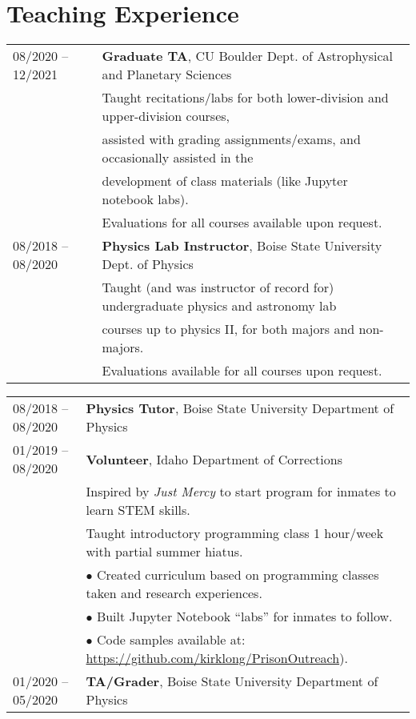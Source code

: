 \documentclass[11pt]{article}
\begin{document}
\section{Teaching Experience}
\begin{tabular}{ll}
08/2020 --	12/2021 & 	\textbf{Graduate TA}, CU Boulder Dept. of Astrophysical and Planetary Sciences \vspace{1mm} \\
      & Taught recitations/labs for both lower-division and upper-division courses, \\
      & assisted with grading assignments/exams, and occasionally assisted in the \\
      & development of class materials (like Jupyter notebook labs).\\
      & Evaluations for all courses available upon request. \vspace{2mm} \\
08/2018 --	08/2020	& 	\textbf{Physics Lab Instructor}, Boise State University Dept. of Physics \vspace{1mm} \\
      & Taught (and was instructor of record for) undergraduate physics and astronomy lab \\
      & courses up to physics II, for both majors and non-majors.\\
      & Evaluations available for all courses upon request. \vspace{2mm} \\

\end{tabular}
\newpage
\begin{tabular}{ll}
08/2018 -- 08/2020   &   \textbf{Physics Tutor}, Boise State University Department of Physics \vspace{2mm} \\

01/2019 -- 08/2020   &   \textbf{Volunteer}, Idaho Department of Corrections \\
      & Inspired by \textit{Just Mercy} to start program for inmates to learn STEM skills.\vspace{2mm} \\
      & Taught introductory programming class 1 hour/week with partial summer hiatus.\\
      & $\bullet$ Created curriculum based on programming classes taken and research experiences.\\
      & $\bullet$ Built Jupyter Notebook ``labs'' for inmates to follow. \\
      & $\bullet$ Code samples available at: \url{https://github.com/kirklong/PrisonOutreach}). \vspace{2mm}\\
01/2020 -- 05/2020   &   \textbf{TA/Grader}, Boise State University Department of Physics

\end{tabular}
\end{document}
